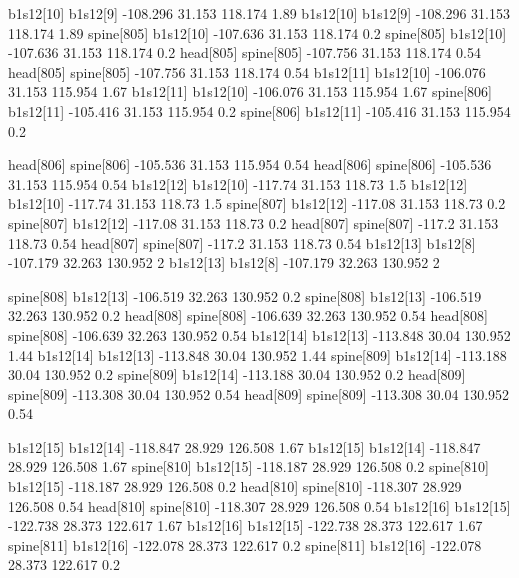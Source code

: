 b1s12[10]    b1s12[9]    -108.296    31.153    118.174    1.89
b1s12[10]    b1s12[9]    -108.296    31.153    118.174    1.89
spine[805]    b1s12[10]    -107.636    31.153    118.174    0.2
spine[805]    b1s12[10]    -107.636    31.153    118.174    0.2
head[805]    spine[805]    -107.756    31.153    118.174    0.54
head[805]    spine[805]    -107.756    31.153    118.174    0.54
b1s12[11]    b1s12[10]    -106.076    31.153    115.954    1.67
b1s12[11]    b1s12[10]    -106.076    31.153    115.954    1.67
spine[806]    b1s12[11]    -105.416    31.153    115.954    0.2
spine[806]    b1s12[11]    -105.416    31.153    115.954    0.2


head[806]    spine[806]    -105.536    31.153    115.954    0.54
head[806]    spine[806]    -105.536    31.153    115.954    0.54
b1s12[12]    b1s12[10]    -117.74    31.153    118.73    1.5
b1s12[12]    b1s12[10]    -117.74    31.153    118.73    1.5
spine[807]    b1s12[12]    -117.08    31.153    118.73    0.2
spine[807]    b1s12[12]    -117.08    31.153    118.73    0.2
head[807]    spine[807]    -117.2    31.153    118.73    0.54
head[807]    spine[807]    -117.2    31.153    118.73    0.54
b1s12[13]    b1s12[8]    -107.179    32.263    130.952    2
b1s12[13]    b1s12[8]    -107.179    32.263    130.952    2


spine[808]    b1s12[13]    -106.519    32.263    130.952    0.2
spine[808]    b1s12[13]    -106.519    32.263    130.952    0.2
head[808]    spine[808]    -106.639    32.263    130.952    0.54
head[808]    spine[808]    -106.639    32.263    130.952    0.54
b1s12[14]    b1s12[13]    -113.848    30.04    130.952    1.44
b1s12[14]    b1s12[13]    -113.848    30.04    130.952    1.44
spine[809]    b1s12[14]    -113.188    30.04    130.952    0.2
spine[809]    b1s12[14]    -113.188    30.04    130.952    0.2
head[809]    spine[809]    -113.308    30.04    130.952    0.54
head[809]    spine[809]    -113.308    30.04    130.952    0.54


b1s12[15]    b1s12[14]    -118.847    28.929    126.508    1.67
b1s12[15]    b1s12[14]    -118.847    28.929    126.508    1.67
spine[810]    b1s12[15]    -118.187    28.929    126.508    0.2
spine[810]    b1s12[15]    -118.187    28.929    126.508    0.2
head[810]    spine[810]    -118.307    28.929    126.508    0.54
head[810]    spine[810]    -118.307    28.929    126.508    0.54
b1s12[16]    b1s12[15]    -122.738    28.373    122.617    1.67
b1s12[16]    b1s12[15]    -122.738    28.373    122.617    1.67
spine[811]    b1s12[16]    -122.078    28.373    122.617    0.2
spine[811]    b1s12[16]    -122.078    28.373    122.617    0.2


